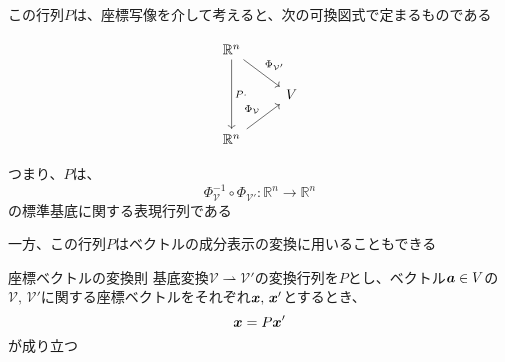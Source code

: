\documentclass[../../../topic_linear-algebra]{subfiles}
\begin{document}
この行列$P$は、座標写像を介して考えると、次の可換図式で定まるものである

\begin{equation*}
  \begin{tikzcd}
    \mathbb{R}^n \arrow[dd, "P\cdot"] \arrow[rd,"{\Phi_{\mathcal{V}'}}"] & \\
    & V \\
    \mathbb{R}^n \arrow[ru,"{\Phi_{\mathcal{V}}}"]
  \end{tikzcd}
\end{equation*}

つまり、$P$は、
\begin{equation*}
  \Phi_{\mathcal{V}}^{-1} \circ \Phi_{\mathcal{V}'} \colon \mathbb{R}^n \to \mathbb{R}^n
\end{equation*}
の標準基底に関する表現行列である

\sectionline

一方、この行列$P$はベクトルの成分表示の変換に用いることもできる

\begin{theorem}{座標ベクトルの変換則}
  基底変換$\mathcal{V} \rightharpoonup \mathcal{V}'$の変換行列を$P$とし、ベクトル$\vb*{a} \in V$の$\mathcal{V},\, \mathcal{V}'$に関する座標ベクトルをそれぞれ$\vb*{x},\, \vb*{x}'$とするとき、
  \begin{equation*}
    \vb*{x} = P \vb*{x}'
  \end{equation*}
  が成り立つ
\end{theorem}
\end{document}
